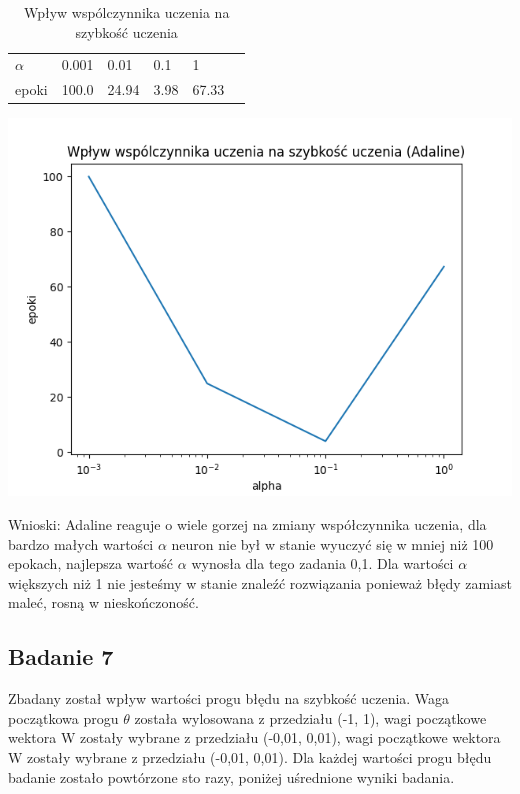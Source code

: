 \documentclass{article}
\begin{document}
\begin{table}[h]
  \centering
  \caption{Wpływ wspólczynnika uczenia na szybkość uczenia}
  \begin{tabular}{llllll}
    \toprule
    $\alpha$ & 0.001 & 0.01 & 0.1 & 1 \\
    epoki & 100.0 & 24.94 & 3.98 & 67.33 \\
    \bottomrule
  \end{tabular}
\end{table}


\begin{center}
\includegraphics[scale=0.8]{ada_exp2.png}
\end{center}

Wnioski: Adaline reaguje o wiele gorzej na zmiany współczynnika uczenia, dla bardzo małych wartości $\alpha$ neuron nie był w stanie wyuczyć się w mniej niż 100 epokach, najlepsza wartość $\alpha$ wynosła dla tego zadania 0,1. Dla wartości $\alpha$ większych niż 1 nie jesteśmy w stanie znaleźć rozwiązania ponieważ błędy zamiast maleć, rosną w nieskończoność.

\newpage
\subsection{Badanie 7}

Zbadany został wpływ wartości progu błędu na szybkość uczenia. Waga początkowa progu $\theta$ została wylosowana z przedziału (-1, 1), wagi początkowe wektora W zostały wybrane z przedziału (-0,01, 0,01), wagi początkowe wektora W zostały wybrane z przedziału (-0,01, 0,01). Dla każdej wartości progu błędu badanie zostało powtórzone sto razy, poniżej uśrednione wyniki badania.\\
\end{document}

